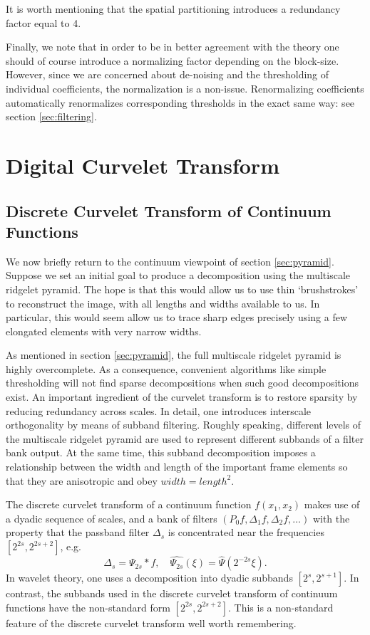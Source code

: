 It is worth mentioning that the spatial partitioning introduces a
redundancy factor equal to 4.

Finally, we note that in order to be in better agreement with the
theory one should of course introduce a normalizing factor depending
on the block-size. However, since we are concerned about de-noising
and the thresholding of individual coefficients, the normalization is
a non-issue.  Renormalizing coefficients automatically renormalizes
corresponding thresholds in the exact same way: see section 
\ref{sec:filtering}.


\section{Digital Curvelet Transform}
\label{sec:curvelet}

\subsection{Discrete Curvelet Transform of Continuum Functions}

We now briefly return to the continuum viewpoint of section
\ref{sec:pyramid}.
Suppose we set an initial goal to produce a decomposition using the
multiscale ridgelet pyramid. The hope is that this
would allow us to use thin `brushstrokes' to reconstruct
the image, with all lengths and widths available to us.
In particular, this would seem allow us to trace sharp edges precisely
using a few elongated elements with very narrow widths.

As mentioned in section \ref{sec:pyramid},
the full multiscale ridgelet pyramid is highly overcomplete.
As a consequence,  convenient algorithms like
simple thresholding will not find sparse
decompositions when such good decompositions exist.
An important ingredient of the curvelet
transform is to restore sparsity by reducing redundancy across scales.
In
detail, one introduces interscale orthogonality by means of
subband filtering. Roughly speaking, different levels of the
multiscale ridgelet pyramid are used to represent different
subbands of a filter bank output.  At the same time, this subband
decomposition imposes a relationship between the width and length
of the important frame elements so that they are anisotropic and obey
$width = length^2$.

The discrete curvelet transform of a continuum
function $f(x_1,x_2)$ makes use of a dyadic sequence of scales,
and a bank of filters $(P_0 f, \Delta_1 f ,
\Delta_2 f , \dots )$ with the property that the passband filter
$\Delta_s$ is concentrated near the frequencies $[2^{2s}, 2^{2s+2}]$,
e.g.
\[
\Delta_s = \Psi_{2s} * f, \quad \widehat{\Psi_{2s}}(\xi) =
\widehat{\Psi}(2^{-2s}\xi).
\]
In wavelet theory, one uses a decomposition into dyadic subbands
$[2^s, 2^{s+1}]$. In contrast, the subbands used
in the discrete curvelet transform of continuum functions have
the non-standard form
$[2^{2s}, 2^{2s+2}]$. This is a non-standard feature of the
discrete curvelet transform well worth remembering.

